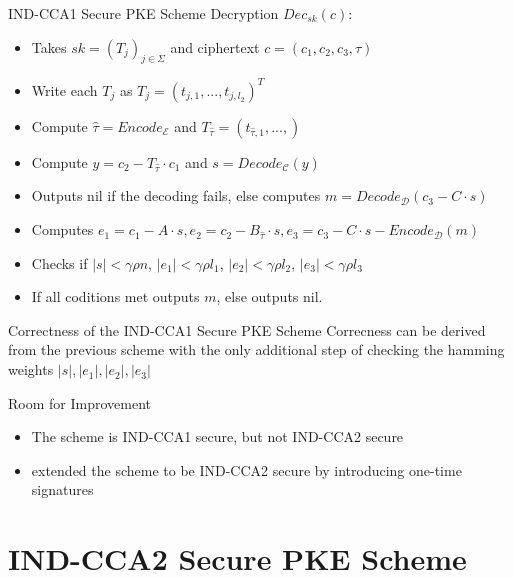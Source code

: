 \documentclass{beamer}
\begin{document}
\begin{frame}{IND-CCA1 Secure PKE Scheme Decryption}
  $Dec_{sk}(c)$:
  \begin{itemize}
    \item Takes $sk = (T_j)_{j \in \Sigma}$ and ciphertext $c = (c_1, c_2, c_3, \tau)$
    \item Write each $T_j$ as $T_j = (t_{j,1},...,t_{j, l_2})^T$
    \item Compute $\hat{\tau} = Encode_{\mathcal{E}}$ and $T_{\hat{\tau}} = (t_{\hat{\tau}, 1}, ... , )$
    \item Compute $y = c_2 - T_{\hat{\tau}} \cdot c_1$ and $s = Decode_{\mathcal{C}}(y)$
    \item Outputs nil if the decoding fails, else computes $m = Decode_{\mathcal{D}}(c_3 - C \cdot s)$
    \item Computes $e_1 = c_1 -A \cdot s, e_2 = c_2 -B_{\hat{\tau}} \cdot s, e_3 = c_3 - C \cdot s - Encode_{\mathcal{D}}(m)$
    \item Checks if $|s| < \gamma \rho n$, $|e_1| < \gamma \rho l_1$, $|e_2| < \gamma \rho l_2$, $|e_3| < \gamma \rho l_3$
    \item If all coditions met outputs $m$, else outputs nil.
  \end{itemize}
\end{frame}

\begin{frame}{Correctness of the IND-CCA1 Secure PKE Scheme}
  Correcness can be derived from the previous scheme with the only additional step of checking the hamming weights $|s|, |e_1|, |e_2|, |e_3|$
\end{frame}

\begin{frame}{Room for Improvement}
  \begin{itemize}
    \item The scheme is IND-CCA1 secure, but not IND-CCA2 secure
    \item \cite{CCA} extended the scheme to be IND-CCA2 secure by introducing one-time signatures
  \end{itemize}
\end{frame}

\section{IND-CCA2 Secure PKE Scheme}
\end{document}

